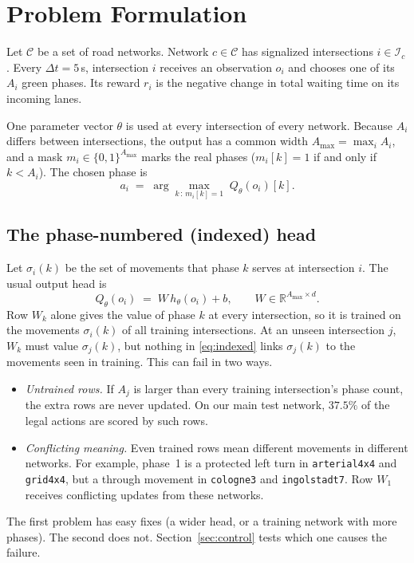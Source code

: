 \documentclass[conference]{IEEEtran}
\begin{document}
\section{Problem Formulation}\label{sec:problem}

Let $\mathcal{C}$ be a set of road networks. Network $c\in\mathcal{C}$ has signalized
intersections $i\in\mathcal{I}_c$. Every $\Delta t=5$\,s, intersection $i$ receives an
observation $o_i$ and chooses one of its $A_i$ green phases. Its reward $r_i$ is the
negative change in total waiting time on its incoming lanes.

One parameter vector $\theta$ is used at every intersection of every network. Because $A_i$
differs between intersections, the output has a common width $A_{\max}=\max_i A_i$, and a
mask $m_i\in\{0,1\}^{A_{\max}}$ marks the real phases ($m_i[k]=1$ if and only if $k<A_i$).
The chosen phase is
\begin{equation}
a_i \;=\; \arg\max_{k\,:\,m_i[k]=1}\; Q_\theta(o_i)[k].
\label{eq:argmax}
\end{equation}

\subsection{The phase-numbered (indexed) head}
Let $\sigma_i(k)$ be the set of movements that phase $k$ serves at intersection $i$. The
usual output head is
\begin{equation}
Q_\theta(o_i) \;=\; W\,h_\theta(o_i) + b,
\qquad W\in\mathbb{R}^{A_{\max}\times d}.
\label{eq:indexed}
\end{equation}
Row $W_k$ alone gives the value of phase $k$ at every intersection, so it is trained on
the movements $\sigma_i(k)$ of all training intersections. At an unseen intersection $j$,
$W_k$ must value $\sigma_j(k)$, but nothing in \eqref{eq:indexed} links $\sigma_j(k)$ to
the movements seen in training. This can fail in two ways.
\begin{itemize}
\item \emph{Untrained rows.} If $A_j$ is larger than every training intersection's phase
      count, the extra rows are never updated. On our main test network, $37.5\%$ of the
      legal actions are scored by such rows.
\item \emph{Conflicting meaning.} Even trained rows mean different movements in different
      networks. For example, phase~1 is a protected left turn in \texttt{arterial4x4} and
      \texttt{grid4x4}, but a through movement in \texttt{cologne3} and
      \texttt{ingolstadt7}. Row $W_1$ receives conflicting updates from these networks.
\end{itemize}
The first problem has easy fixes (a wider head, or a training network with more phases).
The second does not. Section~\ref{sec:control} tests which one causes the failure.
\end{document}
